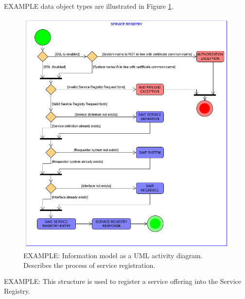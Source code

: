 \documentclass[a4paper]{arrowhead}
\begin{document}
EXAMPLE data object types are illustrated in Figure \ref{fig:model_overview}.

\color{black}

\begin{figure}[ht!]
  \centering
  \includegraphics[width=\textwidth]{figures/post_service_registry_register_activity_uml}
  \caption{\color{red} EXAMPLE:
    Information model as a UML activity diagram.
    Describes the process of service registration.
    \color{black}
  }
  \label{fig:model_overview}
\end{figure}

\newpage
\color{red} 

 EXAMPLE: This structure is used to register a service offering into the Service Registry.
\color{black}
 
\end{document}
